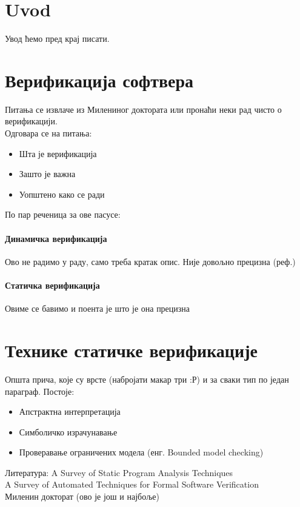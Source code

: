 \documentclass[a4paper]{article}
\begin{document}
{\tableofcontents

\newpage

\section{Uvod}
Увод ћемо пред крај писати.

\section{Верификација софтвера}

Питања се извлаче из Милениног доктората или пронаћи неки рад чисто о верификацији.\\
Одговара се на питања:
\begin{itemize}
\item Шта је верификација
\item Зашто је важна
\item Уопштено како се ради
\end{itemize}

По пар реченица за ове пасусе:
\paragraph{Динамичка верификација}
Ово не радимо у раду, само треба кратак опис. Није довољно прецизна (реф.)
\paragraph{Статичка верификација}
Овиме се бавимо и поента је што је она прецизна


\section{Технике статичке верификације}
Општа прича, које су врсте (набројати макар три :Р) и за сваки тип по један параграф.
Постоје:
\begin{itemize}
\item Апстрактна интерпретација
\item Симболичко израчунавање
\item Проверавање ограничених модела (енг. Bounded model checking)
\end{itemize}
Литература:
A Survey of Static Program Analysis Techniques \cite{survey}\\
A Survey of Automated Techniques for Formal Software Verification \cite{dkw2008}\\
Миленин докторат (ово је још и најбоље)

}
\end{document}
